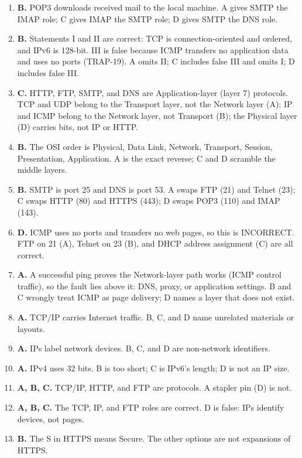 \begin{enumerate}[label=\textbf{Q\arabic*.}, leftmargin=*]
  Downloading (B) is POP3; syncing on the server (C) is IMAP; name
  translation (D) is DNS.
\item \textbf{B.} POP3 downloads received mail to the local machine. A gives
  SMTP the IMAP role; C gives IMAP the SMTP role; D gives SMTP the DNS role.
\item \textbf{B.} Statements I and II are correct: TCP is connection-oriented
  and ordered, and IPv6 is 128-bit. III is false because ICMP transfers no
  application data and uses no ports (TRAP-19). A omits II; C includes false
  III and omits I; D includes false III.
\item \textbf{C.} HTTP, FTP, SMTP, and DNS are Application-layer (layer 7)
  protocols. TCP and UDP belong to the Transport layer, not the Network
  layer (A); IP and ICMP belong to the Network layer, not Transport (B); the
  Physical layer (D) carries bits, not IP or HTTP.
\item \textbf{B.} The OSI order is Physical, Data Link, Network, Transport,
  Session, Presentation, Application. A is the exact reverse; C and D
  scramble the middle layers.
\item \textbf{B.} SMTP is port 25 and DNS is port 53. A swaps FTP (21) and
  Telnet (23); C swaps HTTP (80) and HTTPS (443); D swaps POP3 (110) and
  IMAP (143).
\item \textbf{D.} ICMP uses no ports and transfers no web pages, so this is
  INCORRECT. FTP on 21 (A), Telnet on 23 (B), and DHCP address assignment
  (C) are all correct.
\item \textbf{A.} A successful ping proves the Network-layer path works
  (ICMP control traffic), so the fault lies above it: DNS, proxy, or
  application settings. B and C wrongly treat ICMP as page delivery; D names
  a layer that does not exist.

\item \textbf{A.} TCP/IP carries Internet traffic. B, C, and D name unrelated materials or layouts.
\item \textbf{A.} IPs label network devices. B, C, and D are non-network identifiers.
\item \textbf{A.} IPv4 uses 32 bits. B is too short; C is IPv6's length; D is not an IP size.
\item \textbf{A, B, C.} TCP/IP, HTTP, and FTP are protocols. A stapler pin (D) is not.
\item \textbf{A, B, C.} The TCP, IP, and FTP roles are correct. D is false: IPs identify devices, not pages.
\item \textbf{B.} The S in HTTPS means Secure. The other options are not expansions of HTTPS.


\end{enumerate}
